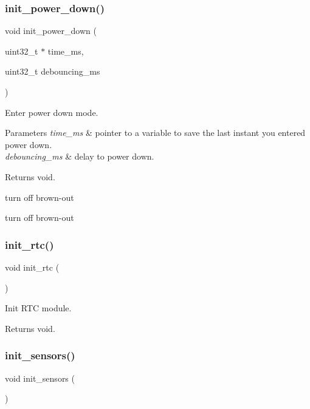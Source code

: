 \subsubsection{\texorpdfstring{init\+\_\+power\+\_\+down()}{init\_power\_down()}}
{\footnotesize\ttfamily void init\+\_\+power\+\_\+down (\begin{DoxyParamCaption}\item[{uint32\+\_\+t $\ast$}]{time\+\_\+ms,  }\item[{uint32\+\_\+t}]{debouncing\+\_\+ms }\end{DoxyParamCaption})}



Enter power down mode. 


\begin{DoxyParams}{Parameters}
{\em time\+\_\+ms} & pointer to a variable to save the last instant you entered power down. \\
\hline
{\em debouncing\+\_\+ms} & delay to power down. \\
\hline
\end{DoxyParams}
\begin{DoxyReturn}{Returns}
void. 
\end{DoxyReturn}
turn off brown-\/out

turn off brown-\/out \mbox{\label{i2c-th_8h_a88533ad02465ce52d4e6de7b2095ec32}} 
\subsubsection{\texorpdfstring{init\+\_\+rtc()}{init\_rtc()}}
{\footnotesize\ttfamily void init\+\_\+rtc (\begin{DoxyParamCaption}{ }\end{DoxyParamCaption})}



Init R\+TC module. 

\begin{DoxyReturn}{Returns}
void. 
\end{DoxyReturn}
\mbox{\label{i2c-th_8h_ad7577ba7f06f417a019b69da8682ede5}} 
\subsubsection{\texorpdfstring{init\+\_\+sensors()}{init\_sensors()}}
{\footnotesize\ttfamily void init\+\_\+sensors (\begin{DoxyParamCaption}{ }\end{DoxyParamCaption})}




